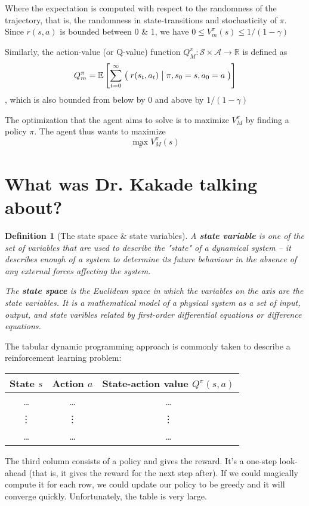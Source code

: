 \documentclass[12pt,reqno]{amsart}
\newtheorem{defn}{Definition}
\newcommand{\Cond}[2]{\bigm( {#1} \bigm\vert {#2}\bigm)}
\newcommand{\E}{\mathbb E}
\begin{document}
Where the expectation is computed with respect to the randomness of the trajectory, that is, the randomness in state-transitions and stochasticity of $\pi$. Since $r(s,a)$ is bounded between 0 \& 1, we have $0 \leq V_{m}^{\pi}(s) \leq 1/(1 - \gamma)$

Similarly, the action-value (or Q-value) function $Q_{M}^{\pi} : \mathcal{S} \times \mathcal{A} \rightarrow \mathbb{R}$ is defined as 
\begin{equation}\label{eqn:Q}
Q_{m}^{\pi} = \E \left[\sum\limits_{t = 0}^{\infty} \Cond{r(s_{t},a_{t})}{\pi, s_{0} = s, a_{0} = a}    \right]
\end{equation}
, which is also bounded from below by 0 and above by $1/(1-\gamma)$

\medskip

The optimization that the agent aims to solve is to maximize $V_{M}^{\pi}$ by finding a policy $\pi$. The agent thus wants to maximize
\begin{equation}\label{eqn:optvalues}
\max\limits_{\pi} V_{M}^{\pi}(s)
\end{equation}

\section{What was Dr. Kakade talking about?}
\begin{shaded}
\begin{defn}[The state space \& state variables]
A \textbf{state variable} is one of the set of variables that are used to describe the "state" of a dynamical system -- it describes enough of a system to determine its future behaviour in the absence of any external forces affecting the system.

The \textbf{state space} is the Euclidean space in which the variables on the axis are the state variables. It is a mathematical model of a physical system as a set of input, output,  and state varibles related by first-order differential equations or difference equations.
\end{defn}
\end{shaded}

The tabular dynamic programming approach is commonly taken to describe a reinforcement learning problem:

\begin{tabular}{|c|c|c|}
\hline
State $s$ & Action $a$ & State-action value $Q^{\pi}(s,a)$ \\
\hline
\ldots & \ldots & \ldots \\
\hline
\vdots & \vdots & \vdots \\
\hline
\ldots & \ldots & \ldots \\
\hline
\end{tabular}
The third column consists of a policy and gives the reward. It's a one-step look-ahead (that is, it gives the reward for the next step after). If we could magically compute it for each row, we could update our policy to be greedy and it will converge quickly. Unfortunately, the table is very large.
\end{document}
